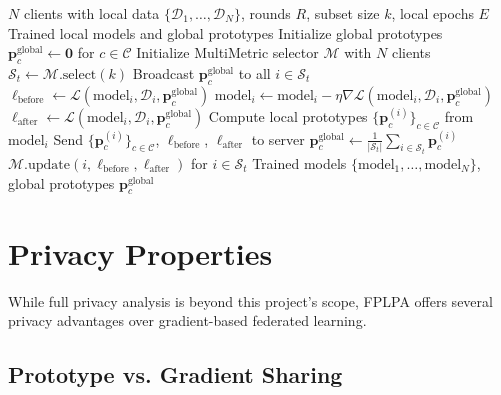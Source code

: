 \begin{algorithm}[htbp]
\caption{FPLPA Training Protocol}
\label{alg:fplpa}
\begin{algorithmic}[1]
\REQUIRE $N$ clients with local data $\{\mathcal{D}_1, \ldots, \mathcal{D}_N\}$, rounds $R$, subset size $k$, local epochs $E$
\ENSURE Trained local models and global prototypes
\STATE Initialize global prototypes $\mathbf{p}_c^{\text{global}} \gets \mathbf{0}$ for $c \in \mathcal{C}$
\STATE Initialize MultiMetric selector $\mathcal{M}$ with $N$ clients
    \STATE $\mathcal{S}_t \gets \mathcal{M}.\text{select}(k)$ 
    \STATE Broadcast $\mathbf{p}_c^{\text{global}}$ to all $i \in \mathcal{S}_t$
        \STATE $\ell_{\text{before}} \gets \mathcal{L}(\text{model}_i, \mathcal{D}_i, \mathbf{p}_c^{\text{global}})$
            \STATE $\text{model}_i \gets \text{model}_i - \eta \nabla \mathcal{L}(\text{model}_i, \mathcal{D}_i, \mathbf{p}_c^{\text{global}})$
        \ENDFOR
        \STATE $\ell_{\text{after}} \gets \mathcal{L}(\text{model}_i, \mathcal{D}_i, \mathbf{p}_c^{\text{global}})$
        \STATE Compute local prototypes $\{\mathbf{p}_c^{(i)}\}_{c \in \mathcal{C}}$ from $\text{model}_i$
        \STATE Send $\{\mathbf{p}_c^{(i)}\}_{c \in \mathcal{C}}$, $\ell_{\text{before}}$, $\ell_{\text{after}}$ to server
    \ENDFOR
        \STATE $\mathbf{p}_c^{\text{global}} \gets \frac{1}{|\mathcal{S}_t|} \sum_{i \in \mathcal{S}_t} \mathbf{p}_c^{(i)}$
    \ENDFOR
    \STATE $\mathcal{M}.\text{update}(i, \ell_{\text{before}}, \ell_{\text{after}})$ for $i \in \mathcal{S}_t$
\ENDFOR
\RETURN Trained models $\{\text{model}_1, \ldots, \text{model}_N\}$, global prototypes $\mathbf{p}_c^{\text{global}}$
\end{algorithmic}
\end{algorithm}

\section{Privacy Properties}

While full privacy analysis is beyond this project's scope, FPLPA offers several privacy advantages over gradient-based federated learning.

\subsection{Prototype vs. Gradient Sharing}

